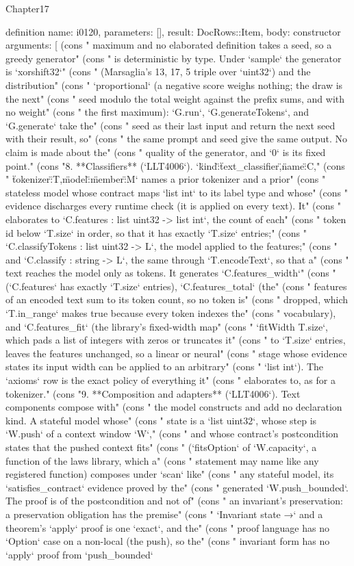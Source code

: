 \begin{lexlean}{Chapter17}
\begin{semanticmodule}
definition{
  name: i0120,
  parameters: [],
  result: DocRows::Item,
  body: constructor{
    arguments: [
      (cons "   maximum and no elaborated definition takes a seed, so a greedy generator" (cons "   is deterministic by type. Under `sample` the generator is `xorshift32`" (cons "   (Marsaglia's 13, 17, 5 triple over `uint32`) and the distribution" (cons "   `proportional` (a negative score weighs nothing; the draw is the next" (cons "   seed modulo the total weight against the prefix sums, and with no weight" (cons "   the first maximum): `G.run`, `G.generateTokens`, and `G.generate` take the" (cons "   seed as their last input and return the next seed with their result, so" (cons "   the same prompt and seed give the same output. No claim is made about the" (cons "   quality of the generator, and `0` is its fixed point." (cons "8. **Classifiers** (`LLT4006`). `{\"kind\":\"text_classifier\",\"name\":C," (cons "   \"tokenizer\":T,\"model\":{\"member\":M}}` names a prior tokenizer and a prior" (cons "   stateless model whose contract maps `list int` to its label type and whose" (cons "   evidence discharges every runtime check (it is applied on every text). It" (cons "   elaborates to `C.features : list uint32 -> list int`, the count of each" (cons "   token id below `T.size` in order, so that it has exactly `T.size` entries;" (cons "   `C.classifyTokens : list uint32 -> L`, the model applied to the features;" (cons "   and `C.classify : string -> L`, the same through `T.encodeText`, so that a" (cons "   text reaches the model only as tokens. It generates `C.features_width`" (cons "   (`C.features` has exactly `T.size` entries), `C.features_total` (the" (cons "   features of an encoded text sum to its token count, so no token is" (cons "   dropped, which `T.in_range` makes true because every token indexes the" (cons "   vocabulary), and `C.features_fit` (the library's fixed-width map" (cons "   `fitWidth T.size`, which pads a list of integers with zeros or truncates it" (cons "   to `T.size` entries, leaves the features unchanged, so a linear or neural" (cons "   stage whose evidence states its input width can be applied to an arbitrary" (cons "   `list int`). The `axioms` row is the exact policy of everything it" (cons "   elaborates to, as for a tokenizer." (cons "9. **Composition and adapters** (`LLT4006`). Text components compose with" (cons "   the model constructs and add no declaration kind. A stateful model whose" (cons "   state is a `list uint32`, whose step is `W.push` of a context window `W`," (cons "   and whose contract's postcondition states that the pushed context fits" (cons "   (`fitsOption` of `W.capacity`, a function of the laws library, which a" (cons "   statement may name like any registered function) composes under `scan` like" (cons "   any stateful model, its `satisfies_contract` evidence proved by the" (cons "   generated `W.push_bounded`. The proof is of the postcondition and not of" (cons "   an invariant's preservation: a preservation obligation has the premise" (cons "   `Invariant state →` and a theorem's `apply` proof is one `exact`, and the" (cons "   proof language has no `Option` case on a non-local (the push), so the" (cons "   invariant form has no `apply` proof from `push_bounded` }}
\end{semanticmodule}
\end{lexlean}
